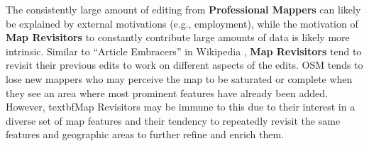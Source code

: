 \documentclass[manuscript,screen,review]{acmart}
\begin{document}
The consistently large amount of editing from \textbf{Professional Mappers} can likely be explained by external motivations (e.g., employment), while the motivation of \textbf {Map Revisitors} to constantly contribute large amounts of data is likely more intrinsic. Similar to “Article Embracers” in Wikipedia \cite{Arazy17}, \textbf {Map Revisitors} tend to revisit their previous edits to work on different aspects of the edits. OSM tends to lose new mappers who may perceive the map to be saturated or complete when they see an area where most prominent features have already been added. However, textbf{Map Revisitors} may be immune to this due to their interest in a diverse set of map features and their tendency to repeatedly revisit the same features and geographic areas to further refine and enrich them.



\end{document}

